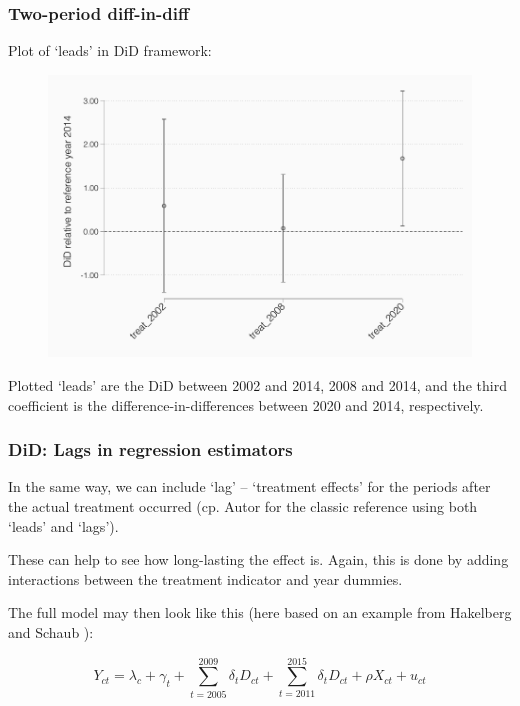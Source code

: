 \documentclass[12pt,english,dvipsnames,aspectratio=169,handout]{beamer}\usepackage[]{graphicx}\usepackage[]{xcolor}
\begin{document}
\begin{frame}
  \frametitle{Two-period diff-in-diff}
\footnotesize

Plot of `leads' in DiD framework:

	 \begin{figure} 
    \includegraphics[height=.55\textheight,keepaspectratio=true]{../04-figures/08/03-lead.pdf}
    \end{figure}
\vspace{-5mm}    
Plotted `leads' are the DiD between 2002 and 2014, 2008 and 2014, and the third coefficient is the difference-in-differences between 2020 and 2014, respectively.

\end{frame}



\begin{frame}
  \frametitle{DiD: Lags in regression estimators}
\footnotesize

In the same way, we can include `lag' -- `treatment effects' for the periods after the actual treatment occurred (cp. Autor \citeyear{autor_outsourcing_2003} for the classic reference using both `leads' and `lags').

These can help to see how long-lasting the effect is. Again, this is done by adding interactions between the treatment indicator and year dummies. 

The full model may then look like this (here based on an example from Hakelberg and Schaub \citeyear{hakelberg_redistributive_2018}): 

\begin{equation*}
Y_{ct} = \lambda_c + \gamma_t + \sum_{t=2005}^{2009} \delta_t D_{ct} + \sum_{t=2011}^{2015} \delta_t D_{ct} + \rho X_{ct} + u_{ct}
\end{equation*}

\end{frame}
\end{document}

